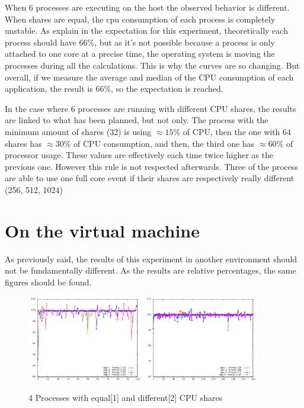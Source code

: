 When 6 processes are executing on the host the observed behavior is different.
When shares are equal, the cpu consumption of each process is completely
unstable.  As explain in the expectation for this experiment, theoretically
each process should have 66\%, but as it's not possible because a process is
only attached to one core at a precise time, the operating system is moving the
processes during all the calculations. This is why the curves are so changing.
But overall, if we measure the average and median of the CPU consumption of
each application, the result is 66\%, so the expectation is reached.

In the case where 6 processes are running with different CPU shares, the
results are linked to what has been planned, but not only. The process with the
minimum amount of shares (32) is using $\approx15\%$ of CPU, then the one with
64 shares has $\approx30\%$ of CPU consumption, and then, the third one has
$\approx60\%$ of processor usage. These values are effectively each time twice
higher as the previous one. However this rule is not respected afterwards. Three
of the process are able to use one full core event if their shares are respectively
really different (256, 512, 1024)

\section{On the virtual machine}

As previously said, the results of this experiment in another environment should
not be fundamentally different. As the results are relative percentages, the
same figures should be found.

\begin{figure}[h!]
\begin{center}
	\includegraphics[width=0.45\textwidth]{./Images/CpuMonitor/vm/4_equalshares.png}
	\includegraphics[width=0.45\textwidth]{./Images/CpuMonitor/vm/4_differentshares.png}
	\caption{4 Processes with equal[1] and different[2] CPU shares}
\end{center}
\end{figure}

